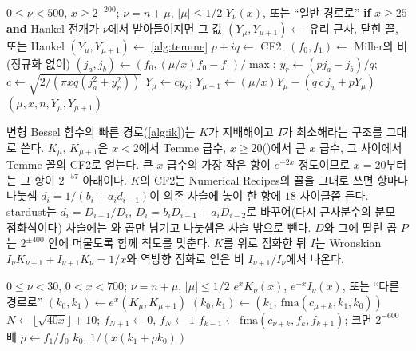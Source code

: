 \begin{algorithm}[htbp]
\begin{algorithmic}[1]
\Require $0\le\nu<500$, $x\ge2^{-200}$; $\nu=n+\mu$, $|\mu|\le1/2$
\Ensure $Y_\nu(x)$, 또는 ``일반 경로로''
\State \textbf{if} $x\ge25$ \textbf{and} Hankel 전개가 $\nu$에서 받아들여지면 \Return 그 값
 $(Y_\mu,Y_{\mu+1})\gets$ 유리 근사, 닫힌 꼴, 또는 Hankel
 $(Y_\mu,Y_{\mu+1})\gets$ \cref{alg:temme}
\Else
  \State $p+iq\gets$ CF2; $(f_0,f_1)\gets$ Miller의 비(정규화 없이) 
  \State $(j_a,j_b)\gets(f_0,(\mu/x)f_0-f_1)/\max$; $y_r\gets(pj_a-j_b)/q$; $c\gets\sqrt{2/(\pi xq(j_a^2+y_r^2))}$
  \State $Y_\mu\gets cy_r$; $Y_{\mu+1}\gets(\mu/x)Y_\mu-(q\,c\,j_a+pY_\mu)$ 
\EndIf
\State \Return {}$(\mu,x,n,Y_\mu,Y_{\mu+1})$ 
\end{algorithmic}
\caption{$Y_\nu$의 빠른 경로 (stardust 의 )}
\label{alg:fast-y}
\end{algorithm}

변형 Bessel 함수의 빠른 경로(\cref{alg:ik})는 $K$가 지배해이고 $I$가 최소해라는 구조를 그대로 쓴다. $K_\mu$, $K_{\mu+1}$은 $x<2$에서 Temme 급수, $x\ge20$()에서 큰 $x$ 급수, 그 사이에서 Temme 꼴의 CF2로 얻는다. 큰 $x$ 급수의 가장 작은 항이 $e^{-2x}$ 정도이므로 $x=20$부터는 그 항이 $2^{-57}$ 아래이다. $K$의 CF2는 Numerical Recipes의 꼴을 그대로 쓰면 항마다 나눗셈 $d_i=1/(b_i+a_id_{i-1})$이 의존 사슬에 놓여 한 항에 $18$ 사이클쯤 든다. stardust는 $d_i=D_{i-1}/D_i$, $D_i=b_iD_{i-1}+a_iD_{i-2}$로 바꾸어(다시 근사분수의 분모 점화식이다) 사슬에는 와 곱만 남기고 나눗셈은 사슬 밖으로 뺀다. $D$와 그에 딸린 곱 $P$는 $2^{\pm400}$ 안에 머물도록 함께 척도를 맞춘다. $K$를 위로 점화한 뒤 $I$는 Wronskian $I_\nu K_{\nu+1}+I_{\nu+1}K_\nu=1/x$와 역방향 점화로 얻은 비 $I_{\nu+1}/I_\nu$에서 나온다.

\begin{algorithm}[htbp]
\begin{algorithmic}[1]
\Require $0\le\nu<30$, $0<x<700$; $\nu=n+\mu$, $|\mu|\le1/2$
\Ensure $e^xK_\nu(x)$, $e^{-x}I_\nu(x)$, 또는 ``다른 경로로''
\State $(k_0,k_1)\gets e^x(K_\mu,K_{\mu+1})$ 
 $(k_0,k_1)\gets(k_1,\ \mathrm{fma}(c_{\mu+k},k_1,k_0))$ 
\EndFor
\State $N\gets\lfloor\sqrt{40x}\rfloor+10$; $f_{N+1}\gets0$, $f_N\gets1$
 $f_{k-1}\gets\mathrm{fma}(c_{\nu+k},f_k,f_{k+1})$; 크면 $2^{-600}$배
\EndFor {}
\State $\rho\gets f_1/f_0$ 
\State \Return $k_0$, $1/(x(k_1+\rho k_0))$ 
\end{algorithmic}
\caption{$K_\nu$와 $I_\nu$의 빠른 경로 (stardust 의 , )}
\label{alg:ik}
\end{algorithm}

